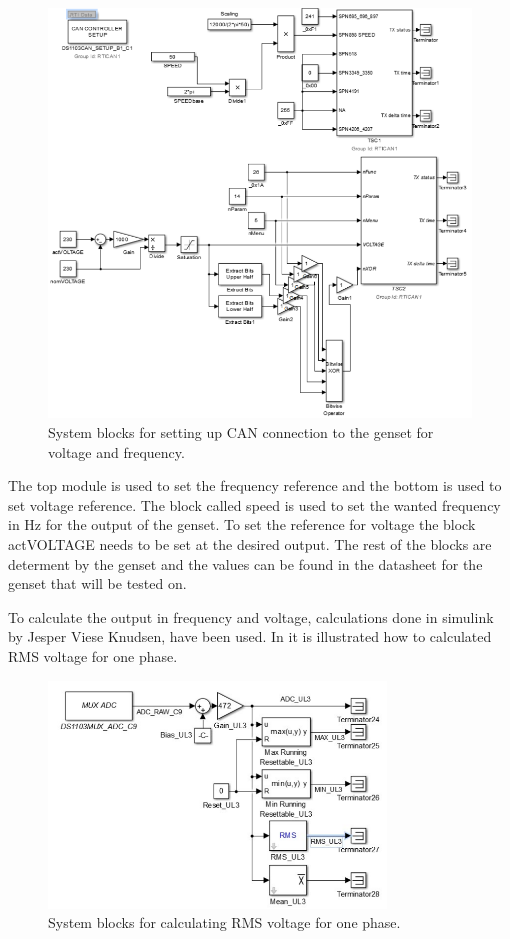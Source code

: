 \begin{figure}[H]
\centering
\includegraphics[width=1\textwidth]{rapport/billeder/cansetup}
\caption{System blocks for setting up CAN connection to the genset for voltage and frequency.}
\label{fig:can_setup}
\end{figure}    

The top module is used to set the frequency reference and the bottom is used to set voltage reference. The block called speed is used to set the wanted frequency in Hz for the output of the genset. To set the reference for voltage the block actVOLTAGE needs to be set at the desired output. The rest of the blocks are determent by the genset and the values can be found in the datasheet for the genset that will be tested on. 

To calculate the output in frequency and voltage, calculations done in simulink by Jesper Viese Knudsen, have been used. In  it is illustrated how to calculated RMS voltage for one phase. 

\begin{figure}[H]
\centering
\includegraphics[width=0.8\textwidth]{rapport/billeder/RMS_for_onePhase_simulink}
\caption{System blocks for calculating RMS voltage for one phase.}
\label{fig:RMS_for_onePhase_simulink}
\end{figure} 

